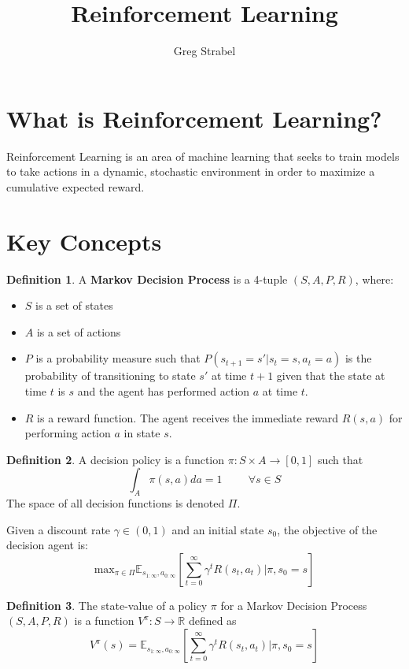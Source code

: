 \documentclass[11pt]{article}
\author{Greg Strabel}
\title{Reinforcement Learning}
\theoremstyle{definition}
\newtheorem{definition}{Definition}[section]
\begin{document}
\maketitle

\section{What is Reinforcement Learning?}

Reinforcement Learning is an area of machine learning that seeks to train models to take actions in a dynamic, stochastic environment in order to maximize a cumulative expected reward.

\section{Key Concepts}
\begin{definition} A \textbf{Markov Decision Process} is a 4-tuple $(S,A,P,R)$, where:
\begin{itemize}
\item $S$ is a set of states
\item $A$ is a set of actions
\item $P$ is a probability measure such that $P(s_{t+1}=s'| s_t=s, a_t=a)$ is the probability of transitioning to state $s'$ at time $t+1$ given that the state at time $t$ is $s$ and the agent has performed action $a$ at time $t$.
\item $R$ is a reward function. The agent receives the immediate reward $R(s,a)$ for performing action $a$ in state $s$. 
\end{itemize}
\end{definition}
\begin{definition} A decision policy is a function $\pi : S \times A \rightarrow [0,1]$ such that
\begin{equation}
\int_A \pi(s,a)da=1 \hspace{1cm} \forall s\in S
\end{equation}
The space of all decision functions is denoted $\Pi$.
\end{definition}
Given a discount rate $\gamma \in (0,1)$ and an initial state $s_0$, the objective of the decision agent is:
\begin{equation}
\mathrm{max}_{\pi \in \Pi} \mathbb{E}_{s_{1:\infty},a_{0:\infty}} \left[ \sum_{t=0}^{\infty} \gamma^t R(s_t, a_t) | \pi, s_0 = s \right]
\end{equation}
\begin{definition} The state-value of a policy $\pi$ for a Markov Decision Process $(S,A,P,R)$ is a function $V^{\pi} : S \rightarrow \mathbb{R}$ defined as
\begin{equation}
V^{\pi}(s) = \mathbb{E}_{s_{1:\infty},a_{0:\infty}} \left[ \sum_{t=0}^{\infty} \gamma^t R(s_t, a_t) | \pi, s_0 = s \right]
\end{equation}
\end{definition}
\end{document}
